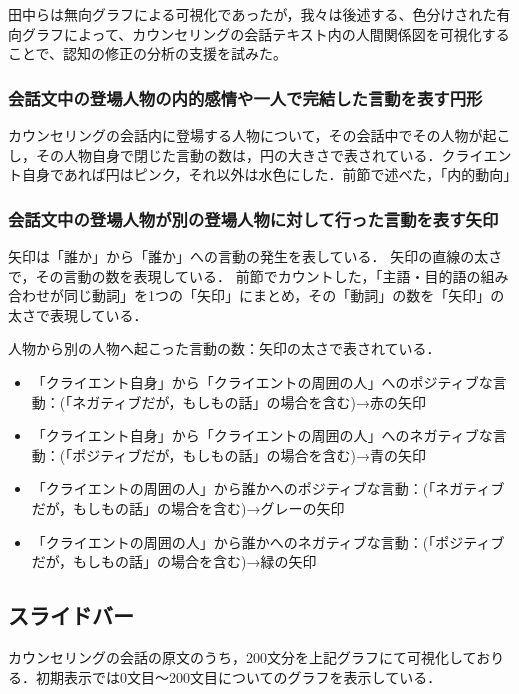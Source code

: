 \documentclass[shuuron]{kuee}
\begin{document}
田中らは無向グラフによる可視化であったが，我々は後述する、色分けされた有向グラフによって、カウンセリングの会話テキスト内の人間関係図を可視化することで、認知の修正の分析の支援を試みた。

\subsubsection{会話文中の登場人物の内的感情や一人で完結した言動を表す円形}

カウンセリングの会話内に登場する人物について，その会話中でその人物が起こし，その人物自身で閉じた言動の数は，円の大きさで表されている．クライエント自身であれば円はピンク，それ以外は水色にした．前節で述べた，「内的動向」


\subsubsection{会話文中の登場人物が別の登場人物に対して行った言動を表す矢印}

矢印は「誰か」から「誰か」への言動の発生を表している．
矢印の直線の太さで，その言動の数を表現している．
前節でカウントした，「主語・目的語の組み合わせが同じ動詞」を1つの「矢印」にまとめ，その「動詞」の数を「矢印」の太さで表現している．

人物から別の人物へ起こった言動の数：矢印の太さで表されている．


\begin{itemize}
  \item 「クライエント自身」から「クライエントの周囲の人」へのポジティブな言動：(「ネガティブだが，もしもの話」の場合を含む)→赤の矢印
  \item 「クライエント自身」から「クライエントの周囲の人」へのネガティブな言動：(「ポジティブだが，もしもの話」の場合を含む)→青の矢印
  \item 「クライエントの周囲の人」から誰かへのポジティブな言動：(「ネガティブだが，もしもの話」の場合を含む)→グレーの矢印
  \item 「クライエントの周囲の人」から誰かへのネガティブな言動：(「ポジティブだが，もしもの話」の場合を含む)→緑の矢印
\end{itemize}








\subsection{スライドバー}

カウンセリングの会話の原文のうち，200文分を上記グラフにて可視化しておりる．初期表示では0文目〜200文目についてのグラフを表示している．
\end{document}
